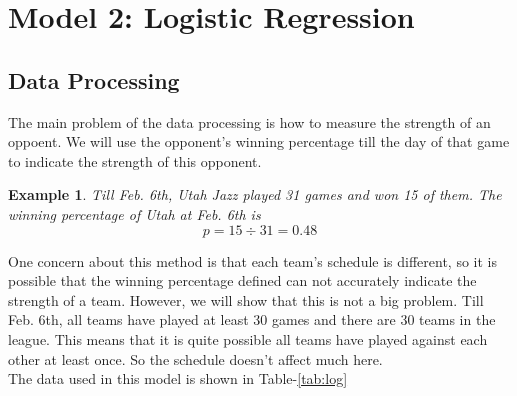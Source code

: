 \documentclass[12pt]{article}
\newtheorem{example}[theorem]{Example}
\begin{document}
\section{Model 2: Logistic Regression}

\subsection{Data Processing}

The main problem of the data processing is how to measure the strength
of an oppoent. We will use the opponent's winning percentage till the
day of that game to indicate the strength of this opponent.

\begin{example}
Till Feb. 6th, Utah Jazz played 31 games and won 15 of them. The
winning percentage of Utah at Feb. 6th is
\begin{equation*}
p = 15 \div 31 = 0.48
\end{equation*}
\end{example}

One concern about this method is that each team's schedule is
different, so it is possible that the winning percentage defined can
not accurately indicate the strength of a team. However, we will show
that this is not a big problem. Till Feb. 6th, all teams have played
at least 30 games and there are 30 teams in the league. This means
that it is quite possible all teams have played against each other at
least once. So the schedule doesn't affect much here. \\

The data used in this model is shown in Table-\ref{tab:log}
\end{document}
